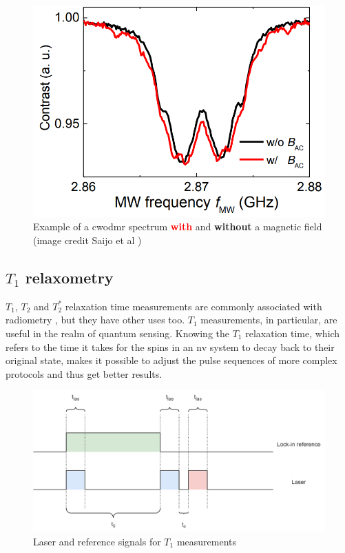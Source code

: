 \begin{figure}[ht]
	\centering
	\includegraphics[width=0.7\linewidth]{img/cw_odmr}
	\caption{Example of a \gls{cwodmr} spectrum \textbf{\textcolor{red}{with}} and \textbf{without} a magnetic field (image credit Saijo et al \cite{saijo2018ac})}
	\label{fig:cwodmr}
\end{figure}


\subsection{$T_1$ relaxometry}
$T_1$, $T_2$ and $T_2^*$ relaxation time measurements are commonly associated with radiometry \cite{ballinger23}, but they have other uses too. $T_1$ measurements, in particular, are useful in the realm of quantum sensing. Knowing the $T_1$ relaxation time, which refers to the time it takes for the spins in an \gls{nv} system to decay back to their original state, makes it possible to adjust the pulse sequences of more complex protocols and thus get better results.  %

\begin{figure}[ht]
	\centering
	\includegraphics[width=0.9\linewidth]{drawio_diagrams/t1_waveforms.drawio}
	\caption{Laser and reference signals for $T_1$ measurements}
	\label{fig:t1waveforms}
\end{figure}

